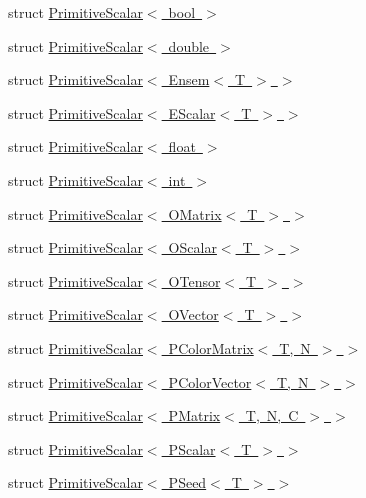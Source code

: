 \begin{DoxyCompactItemize}
struct \mbox{\hyperlink{structENSEM_1_1PrimitiveScalar_3_01bool_01_4}{Primitive\+Scalar$<$ bool $>$}}
\item 
struct \mbox{\hyperlink{structENSEM_1_1PrimitiveScalar_3_01double_01_4}{Primitive\+Scalar$<$ double $>$}}
\item 
struct \mbox{\hyperlink{structENSEM_1_1PrimitiveScalar_3_01Ensem_3_01T_01_4_01_4}{Primitive\+Scalar$<$ Ensem$<$ T $>$ $>$}}
\item 
struct \mbox{\hyperlink{structENSEM_1_1PrimitiveScalar_3_01EScalar_3_01T_01_4_01_4}{Primitive\+Scalar$<$ E\+Scalar$<$ T $>$ $>$}}
\item 
struct \mbox{\hyperlink{structENSEM_1_1PrimitiveScalar_3_01float_01_4}{Primitive\+Scalar$<$ float $>$}}
\item 
struct \mbox{\hyperlink{structENSEM_1_1PrimitiveScalar_3_01int_01_4}{Primitive\+Scalar$<$ int $>$}}
\item 
struct \mbox{\hyperlink{structENSEM_1_1PrimitiveScalar_3_01OMatrix_3_01T_01_4_01_4}{Primitive\+Scalar$<$ O\+Matrix$<$ T $>$ $>$}}
\item 
struct \mbox{\hyperlink{structENSEM_1_1PrimitiveScalar_3_01OScalar_3_01T_01_4_01_4}{Primitive\+Scalar$<$ O\+Scalar$<$ T $>$ $>$}}
\item 
struct \mbox{\hyperlink{structENSEM_1_1PrimitiveScalar_3_01OTensor_3_01T_01_4_01_4}{Primitive\+Scalar$<$ O\+Tensor$<$ T $>$ $>$}}
\item 
struct \mbox{\hyperlink{structENSEM_1_1PrimitiveScalar_3_01OVector_3_01T_01_4_01_4}{Primitive\+Scalar$<$ O\+Vector$<$ T $>$ $>$}}
\item 
struct \mbox{\hyperlink{structENSEM_1_1PrimitiveScalar_3_01PColorMatrix_3_01T_00_01N_01_4_01_4}{Primitive\+Scalar$<$ P\+Color\+Matrix$<$ T, N $>$ $>$}}
\item 
struct \mbox{\hyperlink{structENSEM_1_1PrimitiveScalar_3_01PColorVector_3_01T_00_01N_01_4_01_4}{Primitive\+Scalar$<$ P\+Color\+Vector$<$ T, N $>$ $>$}}
\item 
struct \mbox{\hyperlink{structENSEM_1_1PrimitiveScalar_3_01PMatrix_3_01T_00_01N_00_01C_01_4_01_4}{Primitive\+Scalar$<$ P\+Matrix$<$ T, N, C $>$ $>$}}
\item 
struct \mbox{\hyperlink{structENSEM_1_1PrimitiveScalar_3_01PScalar_3_01T_01_4_01_4}{Primitive\+Scalar$<$ P\+Scalar$<$ T $>$ $>$}}
\item 
struct \mbox{\hyperlink{structENSEM_1_1PrimitiveScalar_3_01PSeed_3_01T_01_4_01_4}{Primitive\+Scalar$<$ P\+Seed$<$ T $>$ $>$}}
\item 

\end{DoxyCompactItemize}
